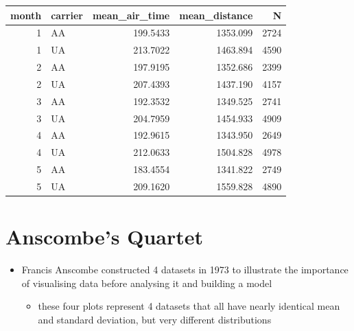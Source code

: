 \documentclass[
  letterpaper,
  DIV=11]{scrartcl}
\providecommand{\tightlist}{%
  \setlength{\itemsep}{0pt}\setlength{\parskip}{0pt}}\usepackage{longtable,booktabs,array}
\begin{document}
\begin{tcolorbox}
\begin{table}
\centering\begingroup\fontsize{20}{22}\selectfont

\begin{tabular}{r|l|r|r|r}
\hline
month & carrier & mean\_air\_time & mean\_distance & N\\
\hline
1 & AA & 199.5433 & 1353.099 & 2724\\
\hline
1 & UA & 213.7022 & 1463.894 & 4590\\
\hline
2 & AA & 197.9195 & 1352.686 & 2399\\
\hline
2 & UA & 207.4393 & 1437.190 & 4157\\
\hline
3 & AA & 192.3532 & 1349.525 & 2741\\
\hline
3 & UA & 204.7959 & 1454.933 & 4909\\
\hline
4 & AA & 192.9615 & 1343.950 & 2649\\
\hline
4 & UA & 212.0633 & 1504.828 & 4978\\
\hline
5 & AA & 183.4554 & 1341.822 & 2749\\
\hline
5 & UA & 209.1620 & 1559.828 & 4890\\
\hline
\end{tabular}
\endgroup{}
\end{table}

\end{tcolorbox}

\hypertarget{anscombes-quartet}{%
\section{Anscombe's Quartet}\label{anscombes-quartet}}

\begin{itemize}
\tightlist
\item
  Francis Anscombe constructed 4 datasets in 1973 to illustrate the
  importance of visualising data before analysing it and building a
  model

  \begin{itemize}
  \tightlist
  \item
    these four plots represent 4 datasets that all have nearly identical
    mean and standard deviation, but very different distributions
  \end{itemize}
\end{itemize}
\end{document}
